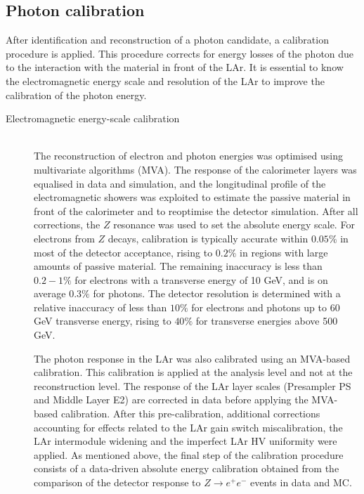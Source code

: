 \documentclass[12pt, twoside]{article}
\numberwithin{equation}{section}
\numberwithin{figure}{section}
\begin{document}
\subsection{Photon calibration}
\label{subsec:PhotonCalibration}

After identification and reconstruction of a photon candidate, a calibration procedure is applied. This procedure corrects for energy losses of the photon due to the interaction with the material in front of the LAr. It is essential to know the electromagnetic energy scale and resolution of the LAr to improve the calibration of the photon energy.
\begin{description}
    \item[Electromagnetic energy-scale calibration]    \hfil \\
    The reconstruction of electron and photon energies was optimised \cite{PhotonCalib} using multivariate algorithms (MVA). The response of the calorimeter layers was equalised in data and simulation, and the longitudinal profile of the electromagnetic showers was exploited to estimate the passive material in front of the calorimeter and to reoptimise the detector simulation. After all corrections, the $Z$ resonance was used to set the absolute energy scale. For electrons from $Z$ decays, calibration is typically accurate within $0.05\%$ in most of the detector acceptance, rising to $0.2\%$ in regions with large amounts of passive material. The remaining inaccuracy is less than $0.2 - 1\%$ for electrons with a transverse energy of 10 GeV, and is on average $0.3\%$ for photons. The detector resolution is determined with a relative inaccuracy of less than $10\%$ for electrons and photons up to 60 GeV transverse energy, rising to $40\%$ for transverse energies above 500 GeV.

    The photon response in the LAr was also calibrated using an MVA-based calibration. This calibration is applied at the analysis level and not at the reconstruction level. The response of the LAr layer scales (Presampler PS and Middle Layer E2) are corrected in data before applying the MVA-based calibration. After this pre-calibration, additional corrections accounting for effects related to the LAr gain switch miscalibration, the LAr intermodule widening and the imperfect LAr HV uniformity were applied. As mentioned above, the final step of the calibration procedure consists of a data-driven absolute energy calibration obtained from the comparison of the detector response to $Z \rightarrow e^{+} e^{-}$ events in data and MC.
\end{description}
\end{document}
